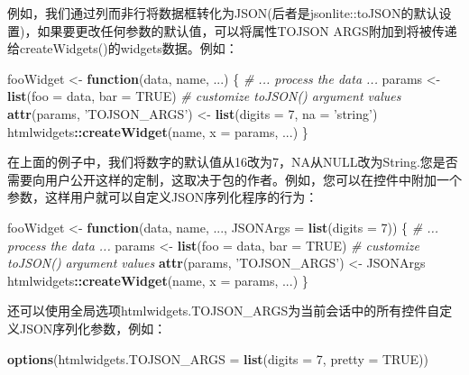 \documentclass[]{book}
\newenvironment{Shaded}{\begin{snugshade}}{\end{snugshade}}
\newcommand{\KeywordTok}[1]{\textcolor[rgb]{0.13,0.29,0.53}{\textbf{#1}}}
\newcommand{\DataTypeTok}[1]{\textcolor[rgb]{0.13,0.29,0.53}{#1}}
\newcommand{\DecValTok}[1]{\textcolor[rgb]{0.00,0.00,0.81}{#1}}
\newcommand{\StringTok}[1]{\textcolor[rgb]{0.31,0.60,0.02}{#1}}
\newcommand{\CommentTok}[1]{\textcolor[rgb]{0.56,0.35,0.01}{\textit{#1}}}
\newcommand{\OtherTok}[1]{\textcolor[rgb]{0.56,0.35,0.01}{#1}}
\newcommand{\ControlFlowTok}[1]{\textcolor[rgb]{0.13,0.29,0.53}{\textbf{#1}}}
\newcommand{\OperatorTok}[1]{\textcolor[rgb]{0.81,0.36,0.00}{\textbf{#1}}}
\newcommand{\NormalTok}[1]{#1}
\theoremstyle{definition}
\theoremstyle{definition}
\theoremstyle{definition}
\theoremstyle{remark}
\begin{document}
例如，我们通过列而非行将数据框转化为JSON(后者是jsonlite::toJSON的默认设置)，如果要更改任何参数的默认值，可以将属性TOJSON
ARGS附加到将被传递给createWidgets()的widgets数据。例如：

\begin{Shaded}
\begin{Highlighting}[]
\NormalTok{fooWidget <-}\StringTok{ }\ControlFlowTok{function}\NormalTok{(data, name, ...) \{}
  \CommentTok{# ... process the data ...}
\NormalTok{  params <-}\StringTok{ }\KeywordTok{list}\NormalTok{(}\DataTypeTok{foo =}\NormalTok{ data, }\DataTypeTok{bar =} \OtherTok{TRUE}\NormalTok{)}
  \CommentTok{# customize toJSON() argument values}
  \KeywordTok{attr}\NormalTok{(params, }\StringTok{'TOJSON_ARGS'}\NormalTok{) <-}\StringTok{ }\KeywordTok{list}\NormalTok{(}\DataTypeTok{digits =} \DecValTok{7}\NormalTok{, }\DataTypeTok{na =} \StringTok{'string'}\NormalTok{)}
\NormalTok{  htmlwidgets}\OperatorTok{::}\KeywordTok{createWidget}\NormalTok{(name, }\DataTypeTok{x =}\NormalTok{ params, ...)}
\NormalTok{\}}
\end{Highlighting}
\end{Shaded}

在上面的例子中，我们将数字的默认值从16改为7，NA从NULL改为String.您是否需要向用户公开这样的定制，这取决于包的作者。例如，您可以在控件中附加一个参数，这样用户就可以自定义JSON序列化程序的行为：

\begin{Shaded}
\begin{Highlighting}[]
\NormalTok{fooWidget <-}\StringTok{ }\ControlFlowTok{function}\NormalTok{(data, name, ..., }\DataTypeTok{JSONArgs =} \KeywordTok{list}\NormalTok{(}\DataTypeTok{digits =} \DecValTok{7}\NormalTok{)) \{}
  \CommentTok{# ... process the data ...}
\NormalTok{  params <-}\StringTok{ }\KeywordTok{list}\NormalTok{(}\DataTypeTok{foo =}\NormalTok{ data, }\DataTypeTok{bar =} \OtherTok{TRUE}\NormalTok{)}
  \CommentTok{# customize toJSON() argument values}
  \KeywordTok{attr}\NormalTok{(params, }\StringTok{'TOJSON_ARGS'}\NormalTok{) <-}\StringTok{ }\NormalTok{JSONArgs}
\NormalTok{  htmlwidgets}\OperatorTok{::}\KeywordTok{createWidget}\NormalTok{(name, }\DataTypeTok{x =}\NormalTok{ params, ...)}
\NormalTok{\}}
\end{Highlighting}
\end{Shaded}

还可以使用全局选项htmlwidgets.TOJSON\_ARGS为当前会话中的所有控件自定义JSON序列化参数，例如：

\begin{Shaded}
\begin{Highlighting}[]
\KeywordTok{options}\NormalTok{(}\DataTypeTok{htmlwidgets.TOJSON_ARGS =} \KeywordTok{list}\NormalTok{(}\DataTypeTok{digits =} \DecValTok{7}\NormalTok{, }\DataTypeTok{pretty =} \OtherTok{TRUE}\NormalTok{))}
\end{Highlighting}
\end{Shaded}
\end{document}
